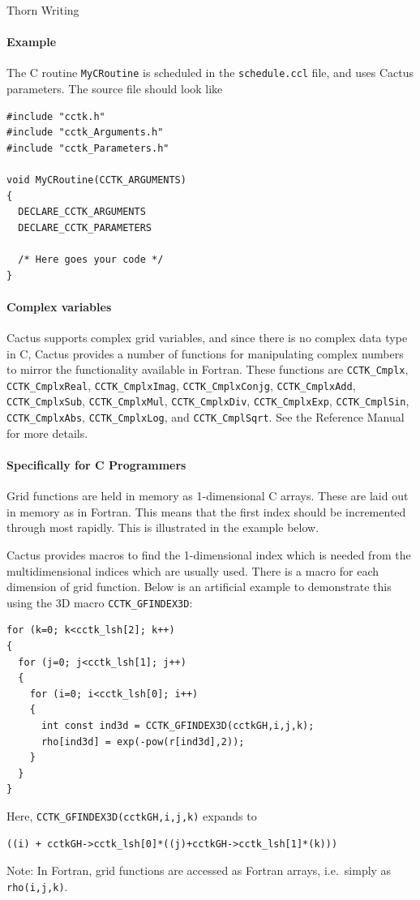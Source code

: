 \begin{cactuspart}{Thorn Writing}
\paragraph{Example}

The C routine \verb|MyCRoutine| is scheduled in the \texttt{schedule.ccl} file,
and uses Cactus parameters. The source file should look like
\begin{verbatim}
#include "cctk.h"
#include "cctk_Arguments.h"
#include "cctk_Parameters.h"

void MyCRoutine(CCTK_ARGUMENTS)
{
  DECLARE_CCTK_ARGUMENTS
  DECLARE_CCTK_PARAMETERS

  /* Here goes your code */
}
\end{verbatim}

\paragraph{Complex variables}

Cactus supports complex grid variables, and since there is no
complex data type in C, Cactus provides a number
of functions for manipulating complex numbers to mirror the
functionality available in Fortran. These functions are \texttt{CCTK\_Cmplx},
\texttt{CCTK\_CmplxReal}, \texttt{CCTK\_CmplxImag}, \texttt{CCTK\_CmplxConjg},
\texttt{CCTK\_CmplxAdd}, \texttt{CCTK\_CmplxSub}, \texttt{CCTK\_CmplxMul},
\texttt{CCTK\_CmplxDiv}, \texttt{CCTK\_CmplxExp}, \texttt{CCTK\_CmplSin},
\texttt{CCTK\_CmplxAbs}, \texttt{CCTK\_CmplxLog}, and \texttt{CCTK\_CmplSqrt}.
See the Reference Manual for more details.


\paragraph{Specifically for C Programmers}

Grid functions are held in memory as 1-dimensional C arrays. These are laid
out in memory as in Fortran. This means that the first index should
be incremented through most rapidly.  This is illustrated in the example
below.

Cactus provides
macros to find the 1-dimensional index which is needed from the multidimensional
indices which are usually used. There is a macro for each dimension of
grid function.  Below is an artificial example to demonstrate this
using the 3D macro \texttt{CCTK\_GFINDEX3D}:
\begin{verbatim}
for (k=0; k<cctk_lsh[2]; k++)
{
  for (j=0; j<cctk_lsh[1]; j++)
  {
    for (i=0; i<cctk_lsh[0]; i++)
    {
      int const ind3d = CCTK_GFINDEX3D(cctkGH,i,j,k);
      rho[ind3d] = exp(-pow(r[ind3d],2));
    }
  }
}
\end{verbatim}
%
Here, \verb|CCTK_GFINDEX3D(cctkGH,i,j,k)| expands to
\begin{verbatim}
((i) + cctkGH->cctk_lsh[0]*((j)+cctkGH->cctk_lsh[1]*(k)))
\end{verbatim}
%
Note: In Fortran, grid functions are accessed as Fortran arrays,
i.e.\ simply as \verb|rho(i,j,k)|.


\end{cactuspart}
